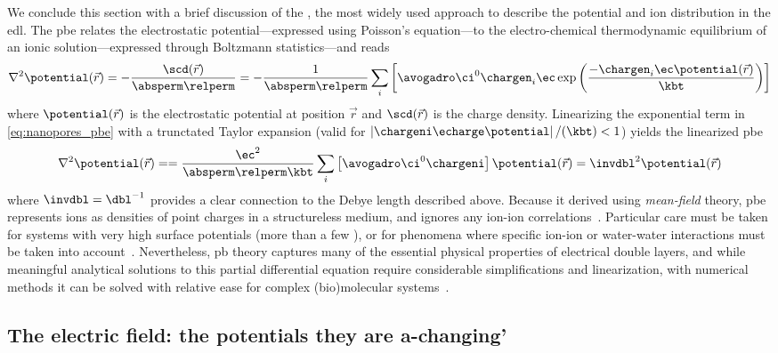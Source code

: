 We conclude this section with a brief discussion of the , the most widely used approach to
describe the potential and ion distribution in the \gls{edl}. The \gls{pbe} relates the electrostatic
potential---expressed using Poisson's equation---to the electro-chemical thermodynamic equilibrium of an ionic
solution---expressed through Boltzmann statistics---and reads~\cite{Gouy-1910,Chapman-1913,Baker-2005}
%
\begin{equation}\label{eq:nanopores_pbe}
  \nabla^2 \potential(\vec{r}) = - \dfrac{\scd(\vec{r})}{\absperm \relperm}
  = - \dfrac{1}{\absperm \relperm}
  \sum_i \left[ \avogadro \ci^0 \chargen_i \ec
         \exp \left( \dfrac{-\chargen_i \ec \potential(\vec{r}) }{\kbt} \right)
        \right]
\end{equation}
%
where $\potential(\vec{r})$ is the electrostatic potential at position $\vec{r}$ and $\scd(\vec{r})$ is the
charge density. Linearizing the exponential term in \cref{eq:nanopores_pbe} with a trunctated Taylor expansion
(valid for $\left| \chargeni \echarge \potential \right| / (\kbt) < 1$) yields the linearized \gls{pbe}
%
\begin{equation}\label{eq:nanopores_pbe_linear}
  \nabla^2 \potential(\vec{r}) = 
  = \dfrac{\ec^2}{\absperm \relperm \kbt} \sum_i \left[ \avogadro \ci^0 \chargeni \right]
      \potential(\vec{r})
  = \invdbl^2 \potential(\vec{r})
\end{equation}
%
where $\invdbl = \dbl^{-1}$ provides a clear connection to the Debye length described above. Because it
derived using \emph{mean-field} theory, \gls{pbe} represents ions as densities of point charges in a
structureless medium, and ignores any ion-ion correlations~\cite{Bocquet-2010}. Particular care must be taken
for systems with very high surface potentials (more than a few \si{\kTe}), or for phenomena where specific
ion-ion or water-water interactions must be taken into account~\cite{Collins-2012}. Nevertheless, \gls{pb}
theory captures many of the essential physical properties of electrical double layers, and while meaningful
analytical solutions to this partial differential equation require considerable simplifications and
linearization, with numerical methods it can be solved with relative ease for complex (bio)molecular
systems~\cite{Baker-2001,Baker-2005}.


\subsection{The electric field: the potentials they are a-changing'}
%

